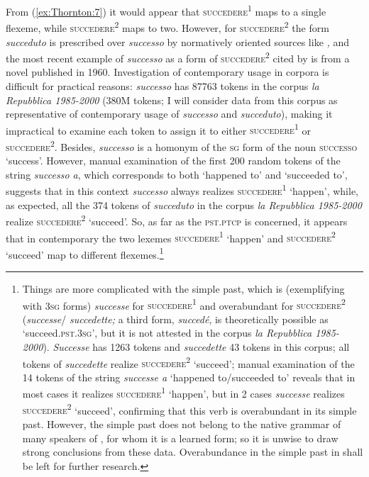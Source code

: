 \documentclass[output=paper]{langsci/langscibook}
\begin{document}
From (\ref{ex:Thornton:7}) it would appear that \textsc{succedere\textsuperscript{1 }}maps
to a single flexeme, while \textsc{succedere\textsuperscript{2 }}\newline maps to
two. However, for \textsc{succedere\textsuperscript{2 }} the form
\emph{succeduto} is prescribed over \emph{successo} by normatively
oriented sources like %
\citet[§ 316]{Serianni1988}%
%
\emph{,} and the most recent
example of \emph{successo} as a form of
\textsc{succedere\textsuperscript{2 }}cited by %
\citet{Serianni1988} %
%
is from a
novel published in 1960. Investigation of contemporary usage in corpora
is difficult for practical reasons: \emph{successo} has 87763 tokens in
the corpus \emph{la Repubblica 1985-2000} (380M tokens; I will consider data from this corpus as representative of contemporary  usage of \emph{successo} and \emph{succeduto}), making it
impractical to examine each token to assign it to either
\textsc{succedere\textsuperscript{1 }}or
\textsc{succedere\textsuperscript{2}}. Besides, \emph{successo} is a
homonym of the \textsc{sg} form of the noun \textsc{successo} `success'.
However, manual examination of the first 200 random tokens of the string
\emph{successo a}, which corresponds to both `happened to' and
`succeeded to', suggests that in this context \emph{successo} always
realizes \textsc{succedere\textsuperscript{1}} `happen', while, as
expected, all the 374 tokens of \emph{succeduto} in the corpus \emph{la
Repubblica 1985-2000} realize \textsc{succedere\textsuperscript{2}}
`succeed'. So, as far as the \textsc{pst.ptcp} is concerned, it appears
that in contemporary  the two lexemes
\textsc{succedere\textsuperscript{1}} `happen' and
\textsc{succedere\textsuperscript{2}} `succeed' map to different
flexemes.\footnote{Things are more complicated with the simple past,
  which is (exemplifying with \textsc{3sg} forms) \emph{successe} for
  \textsc{succedere\textsuperscript{1 }}and overabundant for
  \textsc{succedere\textsuperscript{2}} (\emph{successe}\slash{}  \emph{succedette;} a third form, \emph{succedé}, is theoretically
  possible as `succeed.\textsc{pst.3sg}', but it is not attested in the
  corpus \emph{la Repubblica 1985-2000}). \emph{Successe} has 1263
  tokens and \emph{succedette} 43 tokens in this corpus; all tokens of
  \emph{succedette} realize \textsc{succedere\textsuperscript{2}}
  `succeed'; manual examination of the 14 tokens of the string
  \emph{successe a} `happened to\slash{}succeeded to' reveals that in most
  cases it realizes \textsc{succedere\textsuperscript{1}} `happen', but
  in 2 cases \emph{successe} realizes
  \textsc{succedere\textsuperscript{2}} `succeed', confirming that this
  verb is overabundant in its simple past. However, the simple past does
  not belong to the native grammar of many speakers of , for whom
  it is a learned form; so it is unwise to draw strong conclusions from
  these data. Overabundance in the simple past in  shall be left
  for further research.}
\end{document}
